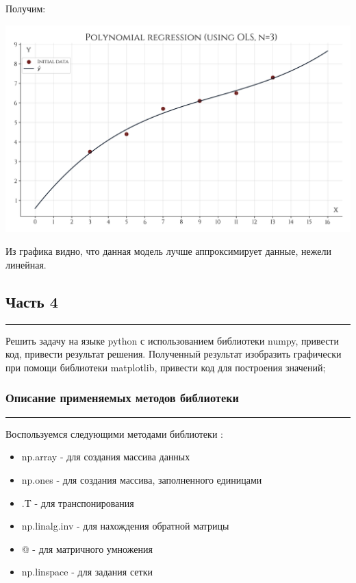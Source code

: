 \documentclass[a4paper, 14pt]{extarticle}
\begin{document}
Получим:

\begin{center}
    \includegraphics[width=1\textwidth, height=1\textheight, keepaspectratio]{Polynomial_Regression_Analytical} \\
\end{center}

Из графика видно, что данная модель лучше аппроксимирует данные, нежели линейная.

\subsection*{{Часть 4}}\vspace{-20pt}\rule{\linewidth}{0.1mm}

Решить задачу на языке python с использованием библиотеки numpy, привести код, 
привести результат решения. Полученный результат изобразить графически при помощи 
библиотеки matplotlib, привести код для построения значений;

\subsubsection*{{Описание применяемых методов библиотеки}}\vspace{-20pt}\rule{\linewidth}{0.1mm}

Воспользуемся следующими методами библиотеки :

\begin{itemize}
    \item np.array - для создания массива данных
    \item np.ones - для создания массива, заполненного единицами
    \item .T - для транспонирования
    \item np.linalg.inv - для нахождения обратной матрицы
    \item @ - для матричного умножения
    \item np.linspace - для задания сетки
\end{itemize}
\end{document}
